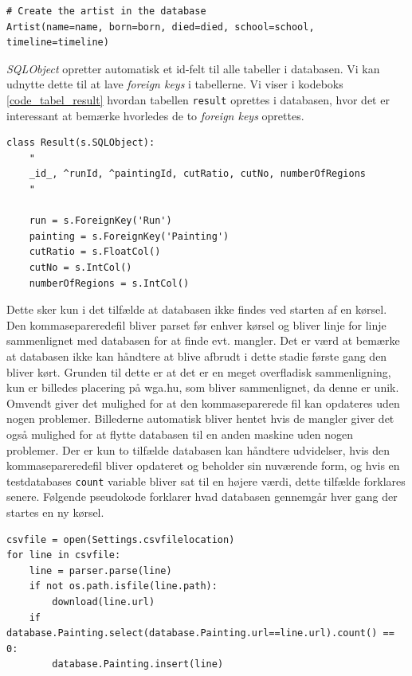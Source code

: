 {\begin{lstlisting}[caption={Oprettelse af en kunstner i databasen.},
    captionpos=b, label={code_new_artist}, frame=tb, breaklines=false,
    float=h]
# Create the artist in the database
Artist(name=name, born=born, died=died, school=school, timeline=timeline)
\end{lstlisting}

\emph{SQLObject} opretter automatisk et id-felt til alle tabeller i
databasen. Vi kan udnytte dette til at lave \emph{foreign keys} i
tabellerne. Vi viser i kodeboks \ref{code_tabel_result} hvordan tabellen
\texttt{result} oprettes i databasen, hvor det er interessant at bemærke
hvorledes de to \emph{foreign keys} oprettes.

\begin{lstlisting}[caption={Pythonkode for oprettelse af \emph{foreign
    keys} i databasen.}, captionpos=b, label={code_tabel_result}, frame=tb,
    breaklines=false, float=h]
class Result(s.SQLObject):
    "
    _id_, ^runId, ^paintingId, cutRatio, cutNo, numberOfRegions
    "

    run = s.ForeignKey('Run')
    painting = s.ForeignKey('Painting')
    cutRatio = s.FloatCol()
    cutNo = s.IntCol()
    numberOfRegions = s.IntCol()
\end{lstlisting}

Dette sker kun i det tilfælde at databasen ikke findes ved starten af en
kørsel. Den kommasepareredefil bliver parset før enhver kørsel og bliver
linje for linje sammenlignet med databasen for at finde evt. mangler.
Det er værd at bemærke at databasen ikke kan håndtere at blive afbrudt i dette stadie første gang den bliver kørt.
Grunden til dette er at det er en meget overfladisk sammenligning, kun
er billedes placering på wga.hu, som bliver sammenlignet, da denne er
unik.
Omvendt giver det mulighed for at den kommaseparerede fil kan opdateres uden nogen
problemer. Billederne automatisk bliver hentet hvis de mangler
giver det også mulighed for at flytte databasen til en anden
maskine uden nogen problemer.
Der er kun to tilfælde databasen kan håndtere udvidelser, hvis den
kommasepareredefil bliver opdateret og beholder sin nuværende form, og
hvis en testdatabases \texttt{count} variable bliver sat til en højere
værdi, dette tilfælde forklares senere.
Følgende pseudokode forklarer hvad databasen gennemgår hver gang der
startes en ny kørsel.
\begin{lstlisting}[caption={Pseudokode for database
initialisering},frame=tb,label={pseudo_init_db}]
csvfile = open(Settings.csvfilelocation)
for line in csvfile:
	line = parser.parse(line)
	if not os.path.isfile(line.path):
		download(line.url)
	if database.Painting.select(database.Painting.url==line.url).count() == 0:
		database.Painting.insert(line)
\end{lstlisting}
}
